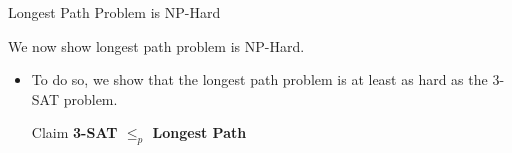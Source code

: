 \begin{frame}{Longest Path Problem is NP-Hard}

   
 We now show longest path problem is NP-Hard. 
  \begin{itemize}
        \item<2-> To do so, we show that the longest path problem is at
least as hard as the 3-SAT problem.

   
\begin{block}{Claim}
\textbf{3-SAT $\leq_p$ Longest Path}
\end{block}
    
    
    \end{itemize} 


\end{frame}